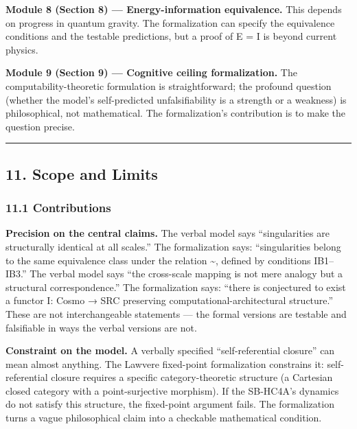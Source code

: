 \documentclass[
]{article}
\begin{document}
\textbf{Module 8 (Section 8) --- Energy-information equivalence.} This
depends on progress in quantum gravity. The formalization can specify
the equivalence conditions and the testable predictions, but a proof of
E = I is beyond current physics.

\textbf{Module 9 (Section 9) --- Cognitive ceiling formalization.} The
computability-theoretic formulation is straightforward; the profound
question (whether the model's self-predicted unfalsifiability is a
strength or a weakness) is philosophical, not mathematical. The
formalization's contribution is to make the question precise.

\begin{center}\rule{0.5\linewidth}{0.5pt}\end{center}

\hypertarget{scope-and-limits}{%
\subsection{11. Scope and Limits}\label{scope-and-limits}}

\hypertarget{contributions}{%
\subsubsection{11.1 Contributions}\label{contributions}}

\textbf{Precision on the central claims.} The verbal model says
``singularities are structurally identical at all scales.'' The
formalization says: ``singularities belong to the same equivalence class
under the relation \textasciitilde, defined by conditions IB1--IB3.''
The verbal model says ``the cross-scale mapping is not mere analogy but
a structural correspondence.'' The formalization says: ``there is
conjectured to exist a functor I: Cosmo → SRC preserving
computational-architectural structure.'' These are not interchangeable
statements --- the formal versions are testable and falsifiable in ways
the verbal versions are not.

\textbf{Constraint on the model.} A verbally specified
``self-referential closure'' can mean almost anything. The Lawvere
fixed-point formalization constrains it: self-referential closure
requires a specific category-theoretic structure (a Cartesian closed
category with a point-surjective morphism). If the SB-HC4A's dynamics do
not satisfy this structure, the fixed-point argument fails. The
formalization turns a vague philosophical claim into a checkable
mathematical condition.
\end{document}
